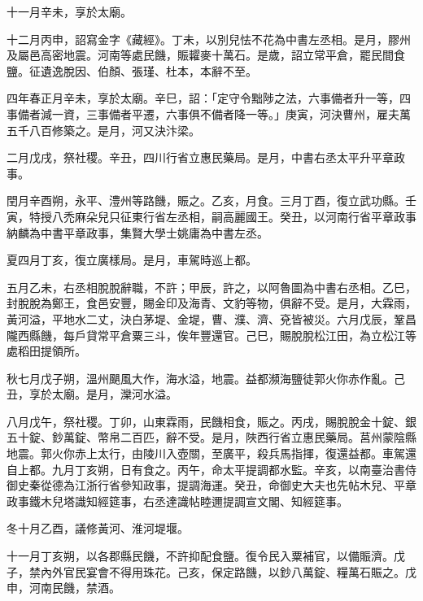 \begin{pinyinscope}
 十一月辛未，享於太廟。



 十二月丙申，詔寫金字《藏經》。丁未，以別兒怯不花為中書左丞相。是月，膠州及屬邑高密地震。河南等處民饑，賑糶麥十萬石。是歲，詔立常平倉，罷民間食鹽。征遺逸脫因、伯顏、張瑾、杜本，本辭不至。



 四年春正月辛未，享於太廟。辛巳，詔：「定守令黜陟之法，六事備者升一等，四事備者減一資，三事備者平遷，六事俱不備者降一等。」庚寅，河決曹州，雇夫萬五千八百修築之。是月，河又決汴梁。



 二月戊戌，祭社稷。辛丑，四川行省立惠民藥局。是月，中書右丞太平升平章政事。



 閏月辛酉朔，永平、澧州等路饑，賑之。乙亥，月食。三月丁酉，復立武功縣。壬寅，特授八禿麻朵兒只征東行省左丞相，嗣高麗國王。癸丑，以河南行省平章政事納麟為中書平章政事，集賢大學士姚庸為中書左丞。



 夏四月丁亥，復立廣樣局。是月，車駕時巡上都。



 五月乙未，右丞相脫脫辭職，不許；甲辰，許之，以阿魯圖為中書右丞相。乙巳，封脫脫為鄭王，食邑安豐，賜金印及海青、文豹等物，俱辭不受。是月，大霖雨，黃河溢，平地水二丈，決白茅堤、金堤，曹、濮、濟、兗皆被災。六月戊辰，鞏昌隴西縣饑，每戶貸常平倉粟三斗，俟年豐還官。己巳，賜脫脫松江田，為立松江等處稻田提領所。



 秋七月戊子朔，溫州颶風大作，海水溢，地震。益都瀕海鹽徒郭火你赤作亂。己丑，享於太廟。是月，灤河水溢。



 八月戊午，祭社稷。丁卯，山東霖雨，民饑相食，賑之。丙戌，賜脫脫金十錠、銀五十錠、鈔萬錠、幣帛二百匹，辭不受。是月，陜西行省立惠民藥局。莒州蒙陰縣地震。郭火你赤上太行，由陵川入壺關，至廣平，殺兵馬指揮，復還益都。車駕還自上都。九月丁亥朔，日有食之。丙午，命太平提調都水監。辛亥，以南臺治書侍御史秦從德為江浙行省參知政事，提調海運。癸丑，命御史大夫也先帖木兒、平章政事鐵木兒塔識知經筵事，右丞達識帖睦邇提調宣文閣、知經筵事。



 冬十月乙酉，議修黃河、淮河堤堰。



 十一月丁亥朔，以各郡縣民饑，不許抑配食鹽。復令民入粟補官，以備賑濟。戊子，禁內外官民宴會不得用珠花。己亥，保定路饑，以鈔八萬錠、糧萬石賑之。戊申，河南民饑，禁酒。




\end{pinyinscope}
